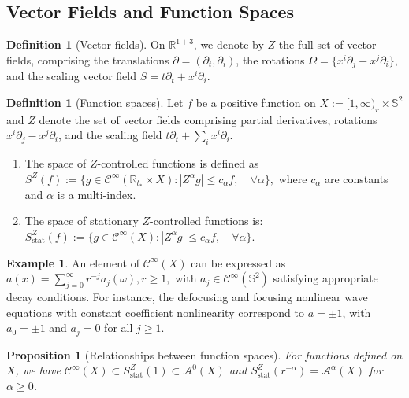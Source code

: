 \documentclass[10pt,a4paper,reqno]{amsart}
\newcommand{\CI}{\mathcal{C}^\infty}
\let\pminus\pm
\renewcommand{\pm}{\phi_{\le m}}
\newtheorem{proposition}[theorem]{Proposition}
\theoremstyle{definition}
\newtheorem{definition}[theorem]{Definition}
\newtheorem{example}[theorem]{Example}
\theoremstyle{remark}
\numberwithin{equation}{section}
\begin{document}
\subsection{Vector Fields and Function Spaces}
\label{app:vector_field_methods}

\begin{definition}[Vector fields]\label{def:vector_fields}
On $\mathbb{R}^{1+3}$, we denote by $Z$ the full set of vector fields, comprising the translations $\partial = (\partial_t, \partial_i)$, the rotations $\Omega = \{x^i \partial_j - x^j \partial_i\}$, and the scaling vector field $S = t\partial_t + x^i \partial_i$.
\end{definition}


\begin{definition}[Function spaces]
Let $f$ be a positive function on $X:=[1,\infty)_r \times \mathbb{S}^2$ and $Z$ denote the set of vector fields comprising partial derivatives, rotations $x^i\partial_j - x^j\partial_i$, and the scaling field $t\partial_t + \sum_i x^i\partial_i$.

\begin{enumerate}
    \item The space of $Z$-controlled functions is defined as
    $S^Z(f) := \{ g \in \CI(\mathbb{R}_{t_*} \times X) : |Z^\alpha g| \leq c_\alpha f, \quad \forall \alpha \},$
    where $c_\alpha$ are constants and $\alpha$ is a multi-index.
    
    \item The space of stationary $Z$-controlled functions is:
    $S^Z_{\text{stat}}(f) := \{ g \in \CI(X) : |Z^\alpha g| \leq c_\alpha f, \quad \forall \alpha \}.$
\end{enumerate}
\end{definition}

\begin{example}
An element of $\CI(X)$ can be expressed as
$a(x) = \sum_{j=0}^\infty r^{-j} a_j(\omega), r \geq 1,$
with $a_j \in \CI(\mathbb{S}^2)$ satisfying appropriate decay conditions. For instance, the defocusing and focusing nonlinear wave equations with constant coefficient nonlinearity correspond to $a = \pminus 1$, with $a_0 = \pminus 1$ and $a_j = 0$ for all $j \geq 1$.
\end{example}

\begin{proposition}[Relationships between function spaces]
\label{prop:function_space_relations}
For functions defined on $X$, we have $\CI(X) \subset S^Z_{\text{stat}}(1) \subset \mathcal{A}^0(X)$ and $S^Z_{\text{stat}}(r^{-\alpha}) = \mathcal{A}^\alpha(X)$ for $\alpha \geq 0$.
\end{proposition}
\end{document}
